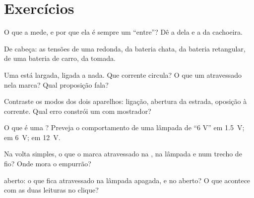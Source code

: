 \section{Exercícios}

\begin{exercise}[$\star$]\label{exo:g8:voltage-voltmeter:1}
O que a  mede, e por que ela é sempre um ``entre''? Dê a
 dela e a  da cachoeira.
\end{exercise}

\begin{exercise}[$\star$]\label{exo:g8:voltage-voltmeter:2}
De cabeça: as tensões de uma  redonda, da bateria chata, da
bateria retangular, de uma bateria de carro, da tomada.
\end{exercise}

\begin{exercise}[$\star$]\label{exo:g8:voltage-voltmeter:3}
Uma  está largada, ligada a nada. Que corrente circula? O que um
 atravessado nela marca? Qual proposição fala?
\end{exercise}

\begin{exercise}[$\star$]\label{exo:g8:voltage-voltmeter:4}
Contraste os modos dos dois aparelhos: ligação, abertura da estrada,
oposição à corrente. Qual erro constrói um  com
mostrador?
\end{exercise}

\begin{exercise}[$\star$]\label{exo:g8:voltage-voltmeter:5}
O que é uma ? Preveja o comportamento de uma lâmpada de
``6 V'' em \qty{1.5}{V}; em \qty{6}{V}; em \qty{12}{V}.
\end{exercise}

\begin{exercise}[$\star$]\label{exo:g8:voltage-voltmeter:6}
Na volta simples, o que o  marca atravessado na , na
lâmpada e num trecho de fio? Onde mora o empurrão?
\end{exercise}

\begin{exercise}[$\star$]\label{exo:g8:voltage-voltmeter:7}
 aberto: o que fica atravessado na lâmpada apagada, e no
 aberto? O que acontece com as duas leituras no clique?
\end{exercise}


